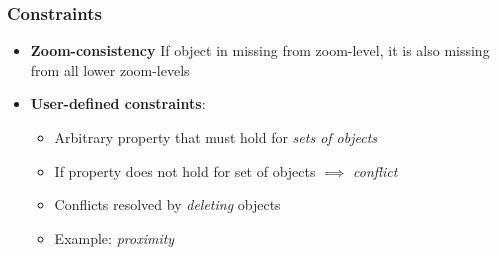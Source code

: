 \documentclass{beamer}
\begin{document}
\frame
{
  \frametitle{Constraints}

  \begin{itemize}
  \item \textbf{Zoom-consistency} If object in missing from zoom-level, it is also missing from all lower zoom-levels~\cite{fusiontables}
  \item \textbf{User-defined constraints}:
  \begin{itemize}
  \item Arbitrary property that must hold for \emph{sets of objects}
  \item If property does not hold for set of objects $\implies$ \emph{conflict}
  \item Conflicts resolved by \emph{deleting} objects
  \item Example: \emph{proximity}
  \end{itemize}
  \end{itemize}
  
}
\end{document}
